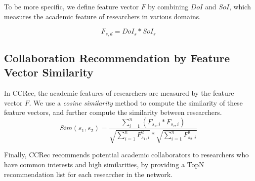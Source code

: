 \documentclass{acm_proc_article-sp}
\begin{document}
To be more specific, we define feature vector $F$ by combining $DoI$ and $SoI$, which measures the academic feature of researchers in various domains.

\begin{equation}
F_{s,d}=DoI_{s}*SoI_{s}
\end{equation}

\subsection{Collaboration Recommendation by Feature Vector Similarity}
In CCRec, the academic features of researchers are measured by the feature vector $F$. We use a \emph{cosine similarity} method to compute the similarity of these feature vectors, and further compute the similarity between researchers.
\begin{equation}
Sim(s_{1},s_{2})=\frac{\sum_{i=1}^{n}(F_{s_{1},i}*F_{s_{2},i})}{\sqrt{\sum_{i=1}^{n}F_{s_{1},i}^2}*\sqrt{\sum_{i=1}^{n}F_{s_{2},i}^2}}
\end{equation}

Finally, CCRec recommends potential academic collaborators to researchers who have common interests and high similarities, by providing a TopN recommendation list for each researcher in the network.

\end{document}
